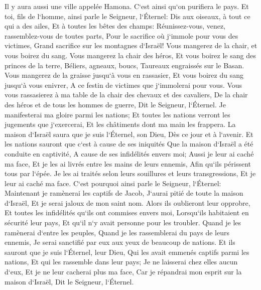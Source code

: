 \verse Il y aura aussi une ville appelée Hamona. C`est ainsi qu`on purifiera le pays. 
\verse Et toi, fils de l`homme, ainsi parle le Seigneur, l`Éternel: Dis aux oiseaux, à tout ce qui a des ailes, Et à toutes les bêtes des champs: Réunissez-vous, venez, rassemblez-vous de toutes parts, Pour le sacrifice où j`immole pour vous des victimes, Grand sacrifice sur les montagnes d`Israël! Vous mangerez de la chair, et vous boirez du sang. 
\verse Vous mangerez la chair des héros, Et vous boirez le sang des princes de la terre, Béliers, agneaux, boucs, Taureaux engraissés sur le Basan. 
\verse Vous mangerez de la graisse jusqu`à vous en rassasier, Et vous boirez du sang jusqu`à vous enivrer, A ce festin de victimes que j`immolerai pour vous. 
\verse Vous vous rassasierez à ma table de la chair des chevaux et des cavaliers, De la chair des héros et de tous les hommes de guerre, Dit le Seigneur, l`Éternel. 
\verse Je manifesterai ma gloire parmi les nations; Et toutes les nations verront les jugements que j`exercerai, Et les châtiments dont ma main les frappera. 
\verse La maison d`Israël saura que je suis l`Éternel, son Dieu, Dès ce jour et à l`avenir. 
\verse Et les nations sauront que c`est à cause de ses iniquités Que la maison d`Israël a été conduite en captivité, A cause de ses infidélités envers moi; Aussi je leur ai caché ma face, Et je les ai livrés entre les mains de leurs ennemis, Afin qu`ils périssent tous par l`épée. 
\verse Je les ai traités selon leurs souillures et leurs transgressions, Et je leur ai caché ma face. 
\verse C`est pourquoi ainsi parle le Seigneur, l`Éternel: Maintenant je ramènerai les captifs de Jacob, J`aurai pitié de toute la maison d`Israël, Et je serai jaloux de mon saint nom. 
\verse Alors ils oublieront leur opprobre, Et toutes les infidélités qu`ils ont commises envers moi, Lorsqu`ils habitaient en sécurité leur pays, Et qu`il n`y avait personne pour les troubler. 
\verse Quand je les ramènerai d`entre les peuples, Quand je les rassemblerai du pays de leurs ennemis, Je serai sanctifié par eux aux yeux de beaucoup de nations. 
\verse Et ils sauront que je suis l`Éternel, leur Dieu, Qui les avait emmenés captifs parmi les nations, Et qui les rassemble dans leur pays; Je ne laisserai chez elles aucun d`eux, 
\verse Et je ne leur cacherai plus ma face, Car je répandrai mon esprit sur la maison d`Israël, Dit le Seigneur, l`Éternel. 

\chapter{}

